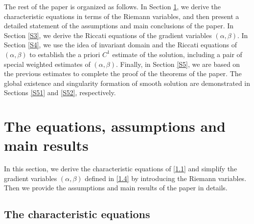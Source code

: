 \documentclass[11pt,reqno]{article}
\numberwithin{equation}{section}
\begin{document}
The rest of the paper is organized as follows.
In Section \ref{S2}, we derive the characteristic equations in terms of the Riemann variables, and then present a detailed statement of the assumptions and main conclusions of the paper.
In Section \ref{S3}, we derive the Riccati equations of the gradient variables $(\alpha, \beta)$.
In Section \ref{S4}, we use the idea of invariant domain and the Riccati equations of $(\alpha, \beta)$ to establish the a priori $C^1$ estimate of the solution, including a pair of special weighted estimates of $(\alpha, \beta)$. Finally, in Section \ref{S5}, we are based on the previous estimates to complete the proof of the theorems of the paper. The global existence and singularity formation of smooth solution are demonstrated in Sections \ref{S51} and \ref{S52}, respectively.




\section{The equations, assumptions and main results}\label{S2}

In this section, we derive the characteristic equations of \eqref{1.1} and simplify the gradient variables $(\alpha,\beta)$ defined in \eqref{1.4} by introducing the Riemann variables. Then we provide the assumptions and main results of the paper in details.

\subsection{The characteristic equations}\label{S21}
\end{document}
